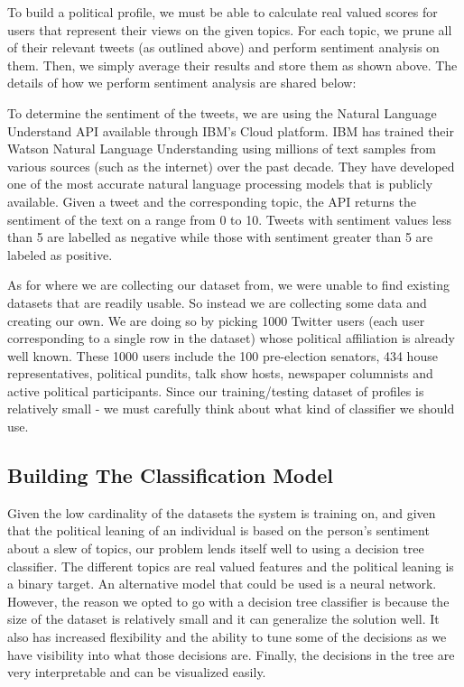 \documentclass[letterpaper]{article} %
\begin{document}
To build a political profile, we must be able to calculate real valued scores for users that represent their views on the given topics. For each topic, we prune all of their relevant tweets (as outlined above) and perform sentiment analysis on them. Then, we simply average their results and store them as shown above. The details of how we perform sentiment analysis are shared below:

To determine the sentiment of the tweets, we are using the Natural Language Understand API available through IBM’s Cloud platform. IBM has trained their Watson Natural Language Understanding using millions of text samples from various sources (such as the internet) over the past decade. They have developed one of the most accurate natural language processing models that is publicly available. Given a tweet and the corresponding topic, the API returns the sentiment of the text on a range from 0 to 10. Tweets with sentiment values less than 5 are labelled as negative while those with sentiment greater than 5 are labeled as positive. 

As for where we are collecting our dataset from, we were unable to find existing datasets that are readily usable. So instead we are collecting some data and creating our own. We are doing so by picking 1000 Twitter users (each user corresponding to a single row in the dataset) whose political affiliation is already well known. These 1000 users include the 100 pre-election senators, 434 house representatives, political pundits, talk show hosts, newspaper columnists and active political participants. Since our training/testing dataset of profiles is relatively small - we must carefully think about what kind of classifier we should use.

\subsection{Building The Classification Model}

Given the low cardinality of the datasets the system is training on, and given that the political leaning of an individual is based on the person’s sentiment about a slew of topics, our problem lends itself well to using a decision tree classifier. The different topics are real valued features and the political leaning is a binary target. An alternative model that could be used is a neural network. However, the reason we opted to go with a decision tree classifier is because the size of the dataset is relatively small and it can generalize the solution well. It also has increased flexibility and the ability to tune some of the decisions as we have visibility into what those decisions are. Finally, the decisions in the tree are very interpretable and can be visualized easily.
\end{document}
